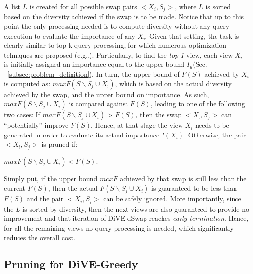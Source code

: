 A list $L$ is created for all possible swap pairs $<X_i, S_j>$, where $L$ is sorted based on the diversity achieved if the swap is to be made. 
%
%
Notice that up to this point the only processing needed is to compute diversity without any query execution to evaluate the importance of any $X_i$. 
%
%
Given that setting, the task is clearly similar to top-k query processing, for which numerous optimization tehniques are proposed (e.g.,\cite{Fagin:2003:CTK:644108.644113, Ilyas:2008:STK:1391729.1391730}).
%
Particularly, to find the {\em top-1} view, each view $X_i$ is initially assigned an importance equal to the upper bound $I_u$(Sec. ~\ref{subsec:problem_definition}). 
%
In turn, the upper bound of $F\left(S\right)$ achieved by $X_i$ is computed as: $maxF(S \backslash S_j \cup X_i)$, which is based on the actual diversity achieved by the swap, and the upper bound on importance.
%
As such, $maxF(S \backslash S_j \cup X_i)$ is compared against $F(S)$, leading to one of the following two cases:
%
If $maxF(S \backslash S_j \cup X_i)$ > $F(S)$, then the swap $<X_i, S_j>$ can ``potentially'' improve $F\left(S\right)$. 
%
Hence, at that stage the view $X_i$ needs to be generated in order to evaluate its actual importance $I(X_i)$. 
%
Otherwise, the pair $<X_i, S_j>$ is pruned if: 
\begin{center}
$maxF(S \backslash S_j \cup X_i) < F(S)$.
\end{center}


Simply put, if the upper bound  $maxF$ achieved by that swap is still less than the current $F(S)$, then the actual $F(S \backslash S_j \cup X_i)$ is guaranteed to be less than $F(S)$ and the pair $<X_i, S_j>$ can be safely ignored. 
%
More importantly, since the $L$ is sorted by diversity, then the next views are also guaranteed to provide no improvement and that iteration of DiVE-dSwap reaches {\em early termination}.  
%
Hence, for all the remaining views no query processing is needed, which significantly reduces the overall cost. 



\subsection{Pruning for DiVE-Greedy}
\label{subsec:pruning-Greedy}

